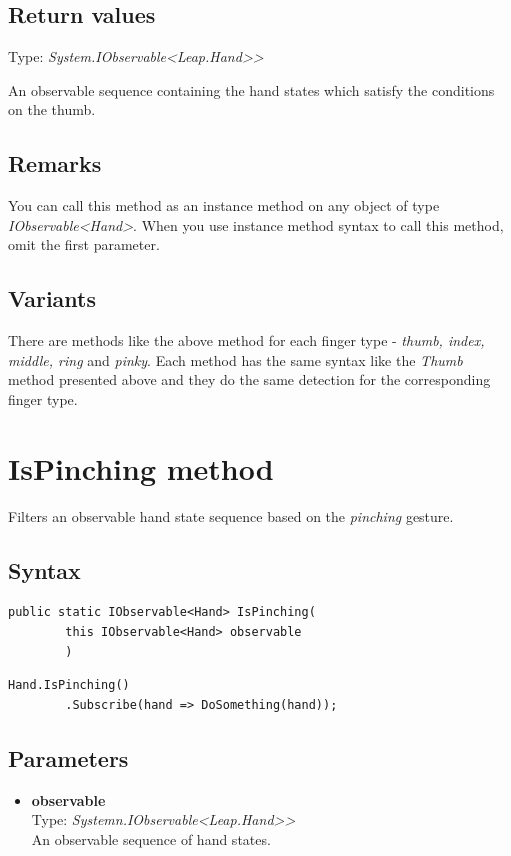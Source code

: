 \documentclass[12pt,a4paper,twoside]{report}
\begin{document}
\subsection{Return values}
Type: \textit{System.IObservable<Leap.Hand>{}>}

An observable sequence containing the hand states which satisfy the conditions on the thumb.

\subsection{Remarks}
You can call this method as an instance method on any object of type \textit{IObservable<Hand>}. When you use 
instance method syntax to call this method, omit the first parameter.

\subsection{Variants}
There are methods like the above method for each finger type - \textit{thumb, index, middle, ring} and \textit{pinky}. Each method has the same syntax like the \textit{Thumb} method presented above and they do the same detection for the corresponding finger type.

\section{IsPinching method}
Filters an observable hand state sequence based on the \textit{pinching} gesture.

\subsection{Syntax}
\begin{lstlisting}[caption=Declaration]
    public static IObservable<Hand> IsPinching(
        this IObservable<Hand> observable
        )
\end{lstlisting}

\begin{lstlisting}[caption=Usage example]
    Hand.IsPinching()
        .Subscribe(hand => DoSomething(hand));
\end{lstlisting}

\subsection{Parameters}
\begin{itemize}
    \item \textbf{observable}\\
        Type: \textit{Systemn.IObservable<Leap.Hand>{}>}\\
        An observable sequence of hand states.
\end{itemize}
\end{document}
